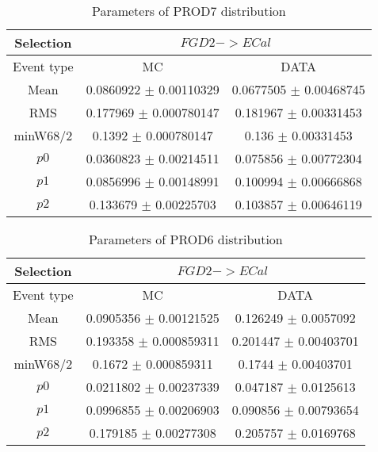 \documentclass[a4paper,12pt]{article}
\begin{document}
\begin{table}[htbp]
\begin{center}
\begin{tabular}{|c|c|c|}
        \hline
        Selection & \multicolumn{2}{|c|}{$FGD2->ECal$}  \\ \hline
        Event type & MC & DATA \\ 
        \hline
        Mean & 0.0860922 $\pm$ 0.00110329 & 0.0677505 $\pm$ 0.00468745 \\ 
        \hline 
        RMS & 0.177969 $\pm$ 0.000780147 & 0.181967 $\pm$ 0.00331453 \\ 
        \hline 
        minW68/2 & 0.1392 $\pm$ 0.000780147 & 0.136 $\pm$ 0.00331453 \\ 
        \hline 
        $p0$ & 0.0360823 $\pm$ 0.00214511 & 0.075856 $\pm$ 0.00772304 \\ 
        \hline 
        $p1$ & 0.0856996 $\pm$ 0.00148991 & 0.100994 $\pm$ 0.00666868 \\ 
        \hline 
        $p2$ & 0.133679 $\pm$ 0.00225703 & 0.103857 $\pm$ 0.00646119 \\ 
        \hline 
\end{tabular}
\caption{Parameters of PROD7 distribution } \vspace{0.2in}
\label{xxx}
\end{center}
\end{table}
\begin{table}[htbp]
\begin{center}
\begin{tabular}{|c|c|c|}
        \hline
        Selection & \multicolumn{2}{|c|}{$FGD2->ECal$}  \\ \hline
        Event type & MC & DATA \\ 
        \hline
        Mean & 0.0905356 $\pm$ 0.00121525 & 0.126249 $\pm$ 0.0057092 \\ 
        \hline 
        RMS & 0.193358 $\pm$ 0.000859311 & 0.201447 $\pm$ 0.00403701 \\ 
        \hline 
        minW68/2 & 0.1672 $\pm$ 0.000859311 & 0.1744 $\pm$ 0.00403701 \\ 
        \hline 
        $p0$ & 0.0211802 $\pm$ 0.00237339 & 0.047187 $\pm$ 0.0125613 \\ 
        \hline 
        $p1$ & 0.0996855 $\pm$ 0.00206903 & 0.090856 $\pm$ 0.00793654 \\ 
        \hline 
        $p2$ & 0.179185 $\pm$ 0.00277308 & 0.205757 $\pm$ 0.0169768 \\ 
        \hline 
\end{tabular}
\caption{Parameters of PROD6 distribution } \vspace{0.2in}
\label{xxx}
\end{center}
\end{table}
\end{document}
